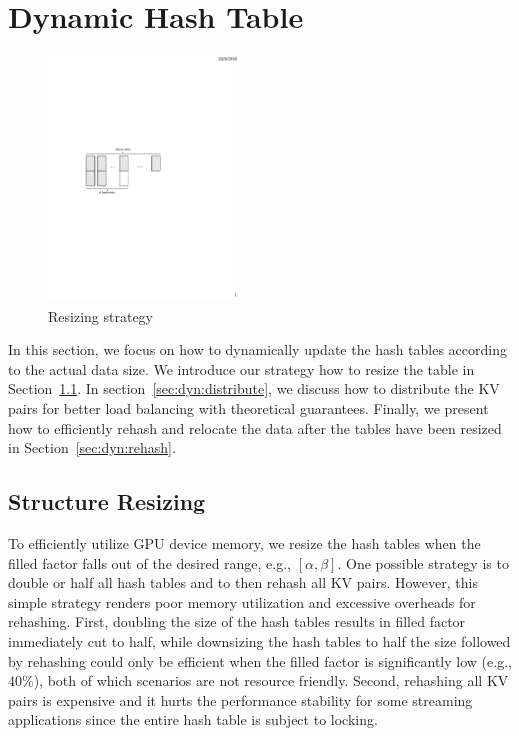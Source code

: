\section{Dynamic Hash Table}\label{sec:dyn}
\begin{figure}[t]
\centering
\includegraphics[width=0.45\textwidth]{fig/MultiTable.pdf}
\caption{Resizing strategy}
\label{fig:resize}
\end{figure}

In this section, we focus on how to dynamically update the hash tables according to the actual data size. 
We introduce our strategy how to resize the table in Section~\ref{sec:dyn:resize}.
In section~\ref{sec:dyn:distribute}, we discuss how to distribute the KV pairs for better load balancing with theoretical guarantees. 
Finally, we present how to efficiently rehash and relocate the data after the tables have been resized in Section~\ref{sec:dyn:rehash}. 

\subsection{Structure Resizing}\label{sec:dyn:resize}
To efficiently utilize GPU device memory, we resize the hash tables when the filled factor falls out of the desired range, e.g., $[\alpha,\beta]$.
One possible strategy is to double or half all hash tables and to then rehash all KV pairs. However, this simple strategy renders poor memory utilization and 
excessive overheads for rehashing. First, doubling the size of the hash tables results in filled factor immediately cut to half, while downsizing the hash tables to half the size followed by rehashing could only be efficient when the filled factor is significantly low (e.g., $40\%$), both of which scenarios are not resource friendly. Second, rehashing all KV pairs is expensive and it hurts the performance stability for some streaming applications since the entire hash table is subject to locking. 

